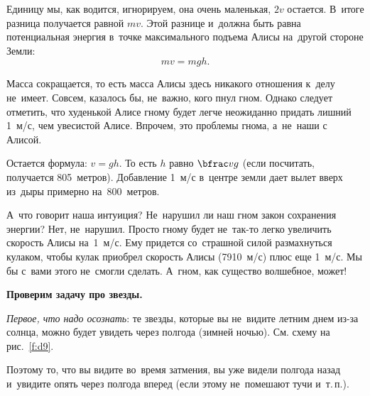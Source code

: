 Единицу мы, как водится, игнорируем, она очень маленькая, $2v$ остается. В~итоге разница получается
равной $mv$. Этой разнице и~должна быть равна потенциальная энергия в~точке максимального подъема
Алисы на~другой стороне Земли:
$$
mv=mgh.
$$

Масса сокращается, то есть масса Алисы здесь никакого отношения к~делу не~имеет. Совсем, казалось
бы, не~важно, кого пнул гном. Однако следует отметить, что худенькой Алисе гному будет легче
неожиданно придать лишний 1~м/с, чем увесистой Алисе. Впрочем, это проблемы гнома, а~не~наши с Алисой.

Остается формула: $v=gh$.
То есть $h$ равно $\bfrac vg$ (если посчитать, получается 805~метров).
Добавление 1~м/с в~центре земли дает вылет вверх из~дыры примерно на~800~метров.

А~что говорит наша интуиция? Не~нарушил ли наш гном закон сохранения энергии? Нет, не~нарушил.
Просто гному будет не~так-то легко увеличить скорость Алисы на~1~м/с. Ему придется со~страшной
силой размахнуться кулаком, чтобы кулак приобрел скорость Алисы (7910~м/с) плюс еще 1~м/с. Мы бы
с~вами этого не~смогли сделать. А~гном, как существо волшебное, может!

%
\textbf{Проверим задачу про звезды.}

\textit{Первое, что надо осознать}: те звезды, которые вы не~видите летним днем из-за солнца, можно
будет увидеть через полгода (зимней ночью). См. схему на рис.~\ref{f:d9}.



Поэтому то, что вы видите во~время затмения, вы уже видели полгода назад и~увидите опять через
полгода вперед (если этому не~помешают тучи и~т.\,п.).

\medskip

\hrulefill

\smallskip

